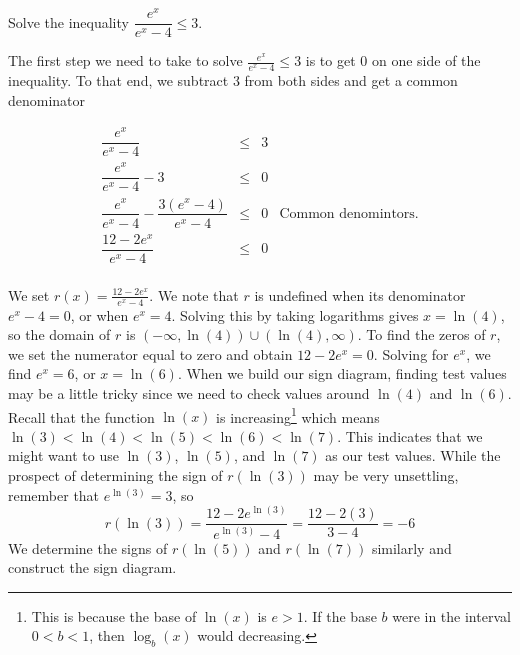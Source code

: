 \documentclass[noauthor, nooutcomes]{ximera}
\begin{document}
\begin{example}
Solve the inequality $\dfrac{e^x}{e^x - 4} \le 3$.
\end{example}
\begin{explanation}
The first step we need to take to solve  $\frac{e^{x}}{e^{x}-4} \leq 3$ is to get $0$ on one side of the inequality. To that end, we subtract $3$ from both sides and get a common denominator


\setlength{\extrarowheight}{12pt}
\[ \begin{array}{rclr}

\dfrac{e^{x}}{e^{x}-4} & \leq & 3 & \\

\dfrac{e^{x}}{e^{x}-4} - 3 & \leq & 0 & \\

\dfrac{e^{x}}{e^{x}-4} - \dfrac{3 \left(e^{x}-4\right)}{e^{x}-4} & \leq & 0 & \mbox{Common denomintors.} \\

\dfrac{12 - 2e^{x}}{e^{x}-4} & \leq & 0 & \\

\end{array}\]
\setlength{\extrarowheight}{2pt}

We set $r(x) = \frac{12 - 2e^{x}}{e^{x}-4}$. We note that $r$ is undefined when its denominator $e^{x}-4=0$, or when $e^{x} = 4$. Solving this by taking logarithms gives $x = \ln(4)$, so the domain of $r$ is $(-\infty, \ln(4)) \cup (\ln(4), \infty)$. To find the zeros of $r$, we set the numerator equal to zero and obtain $12 - 2e^{x} = 0$. Solving for $e^{x}$, we find $e^{x} = 6$, or $x = \ln(6)$. When we build our sign diagram, finding test values may be a little tricky since we need to check values around $\ln(4)$ and $\ln(6)$.  Recall that the function $\ln(x)$ is increasing\footnote{This is because the base of $\ln(x)$ is $e > 1$.  If the base $b$ were in the interval $0 < b < 1$, then $\log_{b}(x)$ would decreasing.} which means $\ln(3) < \ln(4) < \ln(5) < \ln(6) < \ln(7)$.  This indicates that we might want to use $\ln(3)$, $\ln(5)$, and $\ln(7)$ as our test values. While the prospect of determining the sign of $r\left(\ln(3)\right)$ may be very unsettling, remember that $e^{\ln(3)} = 3$, so \[r\left(\ln(3)\right) = \frac{12 - 2e^{\ln(3)}}{e^{\ln(3)}-4} = \frac{12-2(3)}{3-4} = -6\]  We determine the signs of $r\left(\ln(5)\right)$ and $r\left(\ln(7)\right)$ similarly and construct the sign diagram.


\end{explanation}
\end{document}
